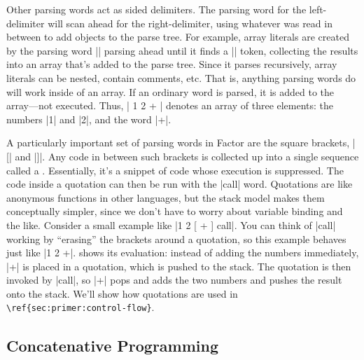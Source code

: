 Other parsing words act as sided delimiters.  The parsing word for the
left-delimiter will scan ahead for the right-delimiter, using whatever was read
in between to add objects to the parse tree.  For example, array literals are
created by the parsing word \factor|{| parsing ahead until it finds a
\factor|}| token, collecting the results into an array that's added to the
parse tree.  Since it parses recursively, array literals can be nested, contain
comments, etc.  That is, anything parsing words do will work
inside of an array.  If an ordinary word is parsed, it is added to the
array---not executed.  Thus, \factor|{ 1 2 + }| denotes an array of three
elements: the numbers \factor|1| and \factor|2|, and the word
\factor|+|.



A particularly important set of parsing words in Factor are the square
brackets, \factor|[| and \factor|]|.  Any code in between such brackets
is collected up into a single sequence called a .  Essentially,
it's a snippet of code whose execution is suppressed.  The code inside a
quotation can then be run with the \factor|call| word.  Quotations are like
anonymous functions in other languages, but the stack model makes them
conceptually simpler, since we don't have to worry about variable binding and
the like.  Consider a small example like \factor|1 2 [ + ] call|.  You can
think of \factor|call| working by ``erasing'' the brackets around a
quotation, so this example behaves just like \factor|1 2 +|.
 shows its evaluation: instead of adding the numbers
immediately, \factor|+| is placed in a quotation, which is pushed to the
stack.  The quotation is then invoked by \factor|call|, so \factor|+|
pops and adds the two numbers and pushes the result onto the stack.  We'll show
how quotations are used in \verb|\ref{sec:primer:control-flow}|.


\subsection{Concatenative Programming}

